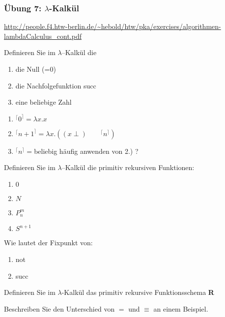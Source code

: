 \begin{card}
	\frametitle{Übung 7: $\lambda$-Kalkül}
	\url{http://people.f4.htw-berlin.de/~hebold/htw/pka/exercises/algorithmen-lambdaCalculus_cont.pdf}
\end{card}

\begin{card}
	Definieren Sie im $\lambda$–Kalkül die
	\begin{enumerate}
	\item die Null (=0)
	\item die Nachfolgefunktion succ
	\item eine beliebige Zahl
	\end{enumerate}
	\hr
	\begin{enumerate}
	\item $^\lceil 0 ^\rceil = \lambda x.x$
	\item $^\lceil n+1 ^\rceil = \lambda x.((x \perp )\qquad ^\lceil n ^\rceil)$
	\item $^\lceil n ^\rceil = $beliebig häufig anwenden von 2.) ?
	\end{enumerate}
\end{card}

\begin{card}
	Definieren Sie im $\lambda$–Kalkül die primitiv rekursiven Funktionen: 
	\begin{enumerate}
	\item $0$
	\item $N$
	\item $P^m_n$
	\item $S^{n+1}$
	\end{enumerate}
\end{card}

\begin{card}
	Wie lautet der Fixpunkt von: 
	\begin{enumerate}
	\item not
	\item succ
	\end{enumerate}
\end{card}

\begin{card}
	Definieren Sie im $\lambda$-Kalkül das primitiv rekursive Funktionsschema	\textbf{R}
\end{card}

\begin{card}
	Beschreiben Sie den Unterschied von $=$ und $\equiv$ an einem Beispiel. 
\end{card}


